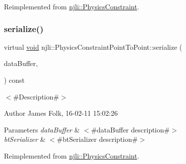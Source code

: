 Reimplemented from \mbox{\hyperlink{classnjli_1_1_physics_constraint_ae3dc487da3069d859bb4ddb05aa2e779}{njli\+::\+Physics\+Constraint}}.

\mbox{\label{classnjli_1_1_physics_constraint_point_to_point_a9327a02aa2883e39074baf3503c2ddcc}} 
\subsubsection{\texorpdfstring{serialize()}{serialize()}}
{\footnotesize\ttfamily virtual \mbox{\hyperlink{_thread_8h_af1e856da2e658414cb2456cb6f7ebc66}{void}} njli\+::\+Physics\+Constraint\+Point\+To\+Point\+::serialize (\begin{DoxyParamCaption}\item[{\mbox{\hyperlink{_thread_8h_af1e856da2e658414cb2456cb6f7ebc66}{void}} $\ast$}]{data\+Buffer,  }\item[{bt\+Serializer $\ast$}]{ }\end{DoxyParamCaption}) const\hspace{0.3cm}{\ttfamily [virtual]}}



$<$\#\+Description\#$>$ 

\begin{DoxyAuthor}{Author}
James Folk, 16-\/02-\/11 15\+:02\+:26
\end{DoxyAuthor}

\begin{DoxyParams}{Parameters}
{\em data\+Buffer} & $<$\#data\+Buffer description\#$>$ \\
\hline
{\em bt\+Serializer} & $<$\#bt\+Serializer description\#$>$ \\
\hline
\end{DoxyParams}


Reimplemented from \mbox{\hyperlink{classnjli_1_1_physics_constraint_ae294d089963246a8e65b41913730efb1}{njli\+::\+Physics\+Constraint}}.

\mbox{\label{classnjli_1_1_physics_constraint_point_to_point_af5f949ec6492fd8c96d5ae03a3aa6436}} 
